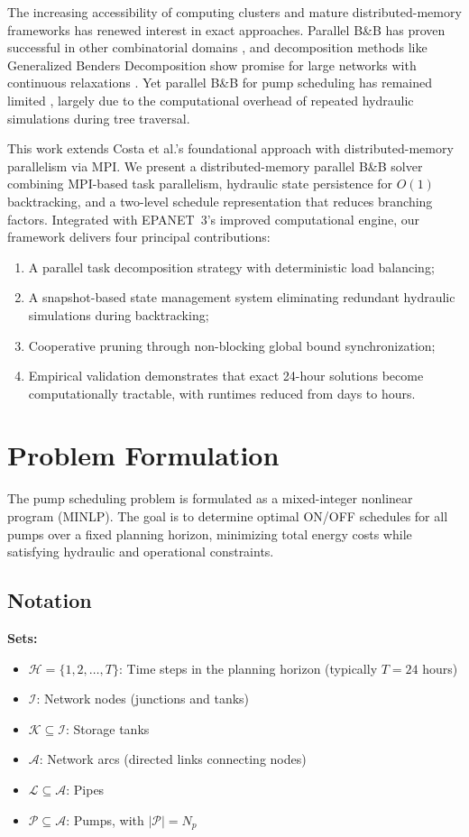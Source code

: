 \documentclass[final,3p,twocolumn]{elsarticle}
\begin{document}
The increasing accessibility of computing clusters and mature distributed-memory frameworks has renewed interest in exact approaches. Parallel B\&B has proven successful in other combinatorial domains \cite{Gendron1994,Li1986,Hrga2021}, and decomposition methods like Generalized Benders Decomposition show promise for large networks with continuous relaxations \cite{Verleye2016}. Yet parallel B\&B for pump scheduling has remained limited \cite{Reis2023}, largely due to the computational overhead of repeated hydraulic simulations during tree traversal.

This work extends Costa et al.'s foundational approach \cite{Costa2016} with distributed-memory parallelism via MPI. We present a distributed-memory parallel B\&B solver combining MPI-based task parallelism, hydraulic state persistence for $O(1)$ backtracking, and a two-level schedule representation that reduces branching factors. Integrated with EPANET~3's improved computational engine, our framework delivers four principal contributions:
\begin{enumerate}
	\item A parallel task decomposition strategy with deterministic load balancing;
	\item A snapshot-based state management system eliminating redundant hydraulic simulations during backtracking;
	\item Cooperative pruning through non-blocking global bound synchronization;
	\item Empirical validation demonstrates that exact 24-hour solutions become computationally tractable, with runtimes reduced from days to hours.
\end{enumerate}

\section{Problem Formulation}

The pump scheduling problem is formulated as a mixed-integer nonlinear program (MINLP). The goal is to determine optimal ON/OFF schedules for all pumps over a fixed planning horizon, minimizing total energy costs while satisfying hydraulic and operational constraints.

\subsection{Notation}

\textbf{Sets:}
\begin{itemize}
	\item $\mathcal{H} = \{1, 2, \ldots, T\}$: Time steps in the planning horizon (typically $T = 24$ hours)
	\item $\mathcal{I}$: Network nodes (junctions and tanks)
	\item $\mathcal{K} \subseteq \mathcal{I}$: Storage tanks
	\item $\mathcal{A}$: Network arcs (directed links connecting nodes)
	\item $\mathcal{L} \subseteq \mathcal{A}$: Pipes
	\item $\mathcal{P} \subseteq \mathcal{A}$: Pumps, with $|\mathcal{P}| = N_p$
\end{itemize}
\end{document}
